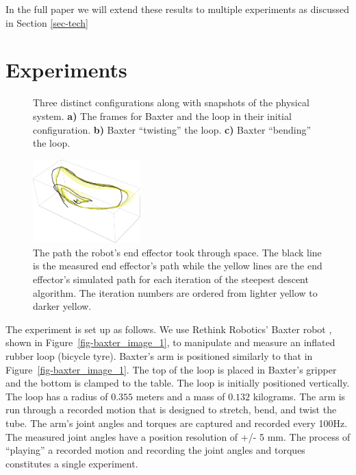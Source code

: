 \documentclass[runningheads,a4paper]{llncs}
\begin{document}
In the full paper we will extend these results to multiple experiments as discussed in Section \ref{sec-tech}


\section{Experiments}
\label{sec-exps}
\begin{figure}
\centering
\def\svgwidth{.9\textwidth}

\caption{Three distinct configurations along with snapshots of the physical system.  \textbf{a)} The frames for Baxter and the loop in their initial configuration. \textbf{b)} Baxter ``twisting'' the loop. \textbf{c)} Baxter ``bending'' the loop.}
\label{fig-3bloops}
\end{figure}
\begin{figure}
\centering
\includegraphics[width = 0.37\textwidth]{paths12.pdf}
\caption{The path the robot's end effector took through space.  The black line is the measured end effector's path while the yellow lines are the end effector's simulated path for each iteration of the steepest descent algorithm.  The iteration numbers are ordered from lighter yellow to darker yellow.  }
\label{fig-paths}
\end{figure}
The experiment is set up as follows.  We use Rethink Robotics' Baxter robot \cite{guizzo2011rethink}, shown in Figure~\ref{fig-baxter_image_1}, to manipulate and measure an inflated rubber loop (bicycle tyre). Baxter's arm is positioned similarly to that in Figure~\ref{fig-baxter_image_1}.  The top of the loop is placed in Baxter's gripper and the bottom is clamped to the table.   The loop is initially positioned vertically. The loop has a radius of $0.355$ meters and a mass of $0.132$ kilograms.  The arm is run through a recorded motion that is designed to stretch, bend, and twist the tube. The arm's joint angles and torques are captured and recorded every 100Hz.  The measured joint angles have a position resolution of +/- 5 mm.  The process of ``playing'' a recorded motion and recording the joint angles and torques constitutes a single experiment.
\end{document}
